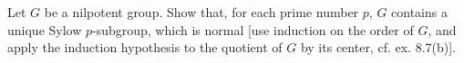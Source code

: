 Let $G$ be a nilpotent group. Show that, for each prime number $p$, $G$ contains a unique Sylow $p$-subgroup, which is normal [use induction on the order of $G$, and apply the induction hypothesis to the quotient of $G$ by its center, cf. ex. 8.7(b)].
